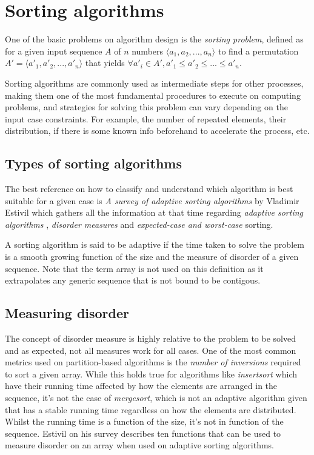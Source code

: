 \section{Sorting algorithms}
One of the basic problems on algorithm design is the \textit{sorting problem}, defined as for a given input sequence $A$ of $n$ numbers $\langle a_1, a_2,...,a_n \rangle$ to find a permutation $A' = \langle a'_1, a'_2,...,a'_n \rangle$ that yields $\forall a'_i \in A', a'_1 \leq a'_2 \leq ... \leq a'_n $.

Sorting algorithms are commonly used as intermediate steps for other processes, making them one of the most fundamental procedures to execute on computing problems, and strategies for solving this problem can vary depending on the input case constraints. For example, the number of repeated elements, their distribution, if there is some known info beforehand to accelerate the process, etc.

\subsection{Types of sorting algorithms}
The best reference on how to classify and understand which algorithm is best suitable for a given case is \textit{A survey of adaptive sorting algorithms} by Vladimir Estivil\cite{estivil92} which gathers all the information at that time regarding \textit{adaptive sorting algorithms} \cite{Mehlhorn_1984}, \textit{disorder measures} and \textit{expected-case and worst-case} sorting.

A sorting algorithm is said to be adaptive if the time taken to solve the problem is a smooth growing function of the size and the measure of disorder of a given sequence. Note that the term array is not used on this definition as it extrapolates any generic sequence that is not bound to be contigous.

\subsection{Measuring disorder}
The concept of disorder measure is highly relative to the problem to be solved and as expected, not all measures work for all cases. One of the most common metrics used on partition-based algorithms is the \textit{number of inversions} required to sort a given array. While this holds true for algorithms like \textit{insertsort} which have their running time affected by how the elements are arranged in the sequence, it's not the case of \textit{mergesort}, which is not an adaptive algorithm given that has a stable running time regardless on how the elements are distributed. Whilst the running time is a function of the size, it's not in function of the sequence. Estivil \cite{estivil92} on his survey describes ten functions that can be used to measure disorder on an array when used on adaptive sorting algorithms.


